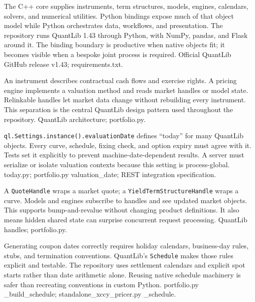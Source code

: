 
{The C++ core supplies instruments, term structures, models, engines, calendars, solvers, and numerical utilities.}
{Python bindings expose much of that object model while Python orchestrates data, workflows, and presentation.}
{The repository runs QuantLib 1.43 through Python, with NumPy, pandas, and Flask around it.}
{The binding boundary is productive when native objects fit; it becomes visible when a bespoke joint process is required.}
{Official QuantLib GitHub release v1.43; requirements.txt.}

{An instrument describes contractual cash flows and exercise rights.}
{A pricing engine implements a valuation method and reads market handles or model state.}
{Relinkable handles let market data change without rebuilding every instrument.}
{This separation is the central QuantLib design pattern used throughout the repository.}
{QuantLib architecture; portfolio.py.}

{\texttt{ql.Settings.instance().evaluationDate} defines ``today'' for many QuantLib objects.}
{Every curve, schedule, fixing check, and option expiry must agree with it.}
{Tests set it explicitly to prevent machine-date-dependent results.}
{A server must serialize or isolate valuation contexts because this setting is process-global.}
{today.py; portfolio.py valuation\_date; REST integration specification.}

{A \texttt{QuoteHandle} wraps a market quote; a \texttt{YieldTermStructureHandle} wraps a curve.}
{Models and engines subscribe to handles and see updated market objects.}
{This supports bump-and-revalue without changing product definitions.}
{It also means hidden shared state can surprise concurrent request processing.}
{QuantLib handles; portfolio.py.}

{Generating coupon dates correctly requires holiday calendars, business-day rules, stubs, and termination conventions.}
{QuantLib's \texttt{Schedule} makes those rules explicit and testable.}
{The repository uses settlement calendars and explicit spot starts rather than date arithmetic alone.}
{Reusing native schedule machinery is safer than recreating conventions in custom Python.}
{portfolio.py \_build\_schedule; standalone\_xccy\_pricer.py \_schedule.}

